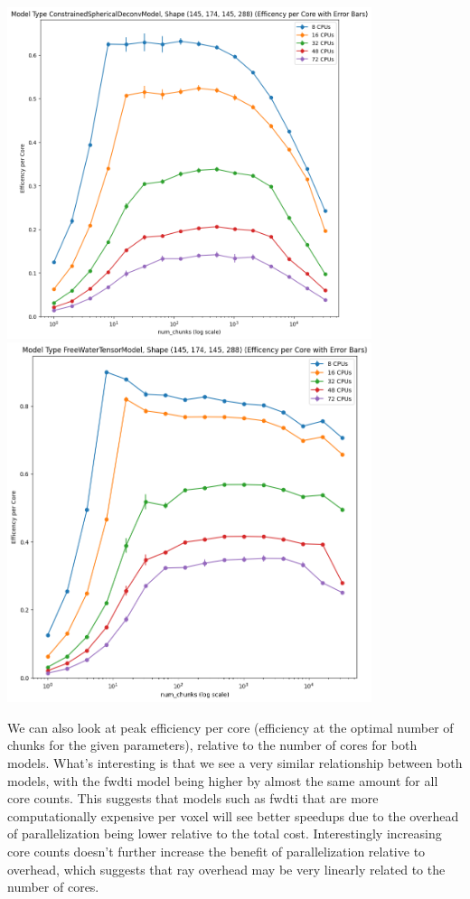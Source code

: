 \documentclass[
  letterpaper,
  DIV=11,
  numbers=noendperiod]{scrartcl}
\begin{document}
\includegraphics[width=0.8\textwidth,height=0.8\textheight]{figures/csdm_efficency.png}
\includegraphics[width=0.8\textwidth,height=0.8\textheight]{figures/fwdtim_efficency.png}

We can also look at peak efficiency per core (efficiency at the optimal
number of chunks for the given parameters), relative to the number of
cores for both models. What's interesting is that we see a very similar
relationship between both models, with the fwdti model being higher by
almost the same amount for all core counts. This suggests that models
such as fwdti that are more computationally expensive per voxel will see
better speedups due to the overhead of parallelization being lower
relative to the total cost. Interestingly increasing core counts doesn't
further increase the benefit of parallelization relative to overhead,
which suggests that ray overhead may be very linearly related to the
number of cores.
\end{document}
